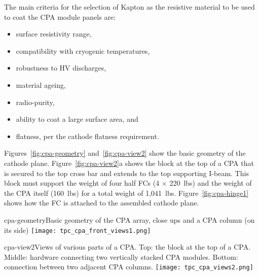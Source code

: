 
The main criteria for the selection of Kapton as the resistive material to be used to coat the CPA module panels are: %
\begin{itemize}	
\item surface resistivity range,
\item compatibility with cryogenic temperatures,
\item robustness to HV discharges, 
\item material ageing,
\item radio-purity,
\item ability to coat a large surface area, and %
\item flatness, per the cathode flatness requirement. 
\end{itemize}


Figures~\ref{fig:cpa-geometry} and~\ref{fig:cpa-view2} show the basic geometry of the cathode plane. Figure~\ref{fig:cpa-view2}a shows the block at the top of a CPA that is secured to the top cross bar and extends to the top supporting I-beam.  This block must support the weight of four half FCs (4 $\times$ 220~lbs) and the weight of the CPA itself (160~lbs) for a total weight of 1,041~lbs.  Figure~\ref{fig:cpa-hinge1} shows how the FC is attached to the assembled cathode plane. 

\begin{cdrfigure}{cpa-geometry}{Basic geometry of the CPA array, close ups and a CPA column (on its side)} 
\texttt{[image: tpc\_cpa\_front\_views1.png]}
\end{cdrfigure}

\begin{cdrfigure}{cpa-view2}{Views of various parts of a CPA. Top: the block at the top of a CPA. Middle: hardware connecting two vertically stacked CPA modules. Bottom: connection between two adjacent CPA columns.} 
\texttt{[image: tpc\_cpa\_views2.png]}
\end{cdrfigure}

